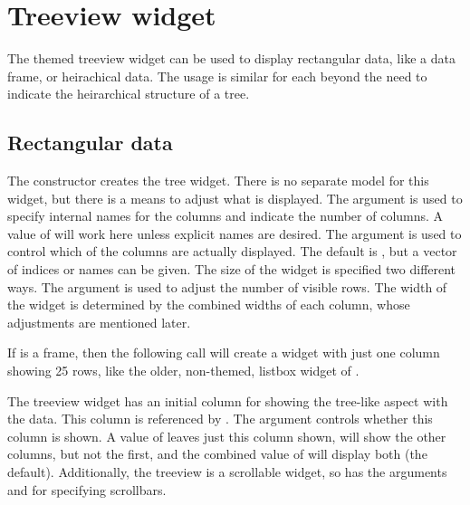\section{Treeview widget}
\label{sec:tcltk:treeview-widget}

The themed treeview widget can be used to display rectangular data,
like a data frame, or heirachical data. The usage is similar for each
beyond the need to indicate the heirarchical structure of a tree.

\subsection{Rectangular data}


The  constructor creates the tree
widget. There is no separate model for this widget, but there is a
means to adjust what is displayed.  The argument
 is used to specify internal names for
the columns and indicate the number of columns. A value of 
will work here unless explicit names are desired. The argument
 is used to control which of the
columns are actually displayed. The default is , but a
vector of indices or names can be given.  The size of the widget is
specified two different ways.  The 
argument is used to adjust the number of visible rows. The width of
the widget is determined by the combined widths of each column, whose
adjustments are mentioned later.



If  is a frame, then the following call will create a widget
with just one column showing 25 rows, like the older, non-themed,
listbox widget of \Tk.

\begin{Schunk}
\end{Schunk}



The treeview widget has an initial column for showing the tree-like
aspect with the data. This column is referenced by . The
 argument controls whether this column is
shown. A value of  leaves just this column shown,
 will show the other columns, but not the first, and
the combined value of  will display both (the
default).  Additionally, the treeview is a scrollable widget, so has
the arguments  and
 for specifying scrollbars.

